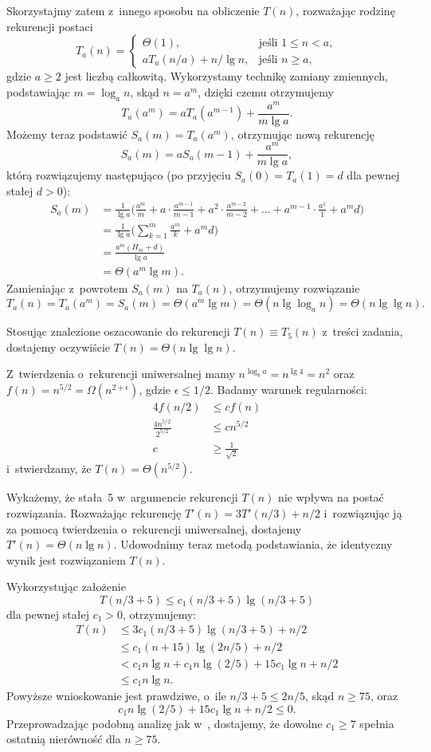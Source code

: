 Skorzystajmy zatem z~innego sposobu na obliczenie $T(n)$, rozważając rodzinę rekurencji postaci
\[
	T_a(n) = \begin{cases}
		\Theta(1), & \text{jeśli $1\le n<a$}, \\
		aT_a(n/a)+n/\!\lg n, & \text{jeśli $n\ge a$},
	\end{cases}
\]
gdzie $a\ge2$ jest liczbą całkowitą. Wykorzystamy technikę zamiany zmiennych, podstawiając $m=\log_an$, skąd $n=a^m$, dzięki czemu otrzymujemy
\[
	T_a(a^m) = aT_a(a^{m-1})+\frac{a^m}{m\lg a}.
\]
Możemy teraz podstawić $S_a(m)=T_a(a^m)$, otrzymując nową rekurencję
\[
	S_a(m) = aS_a(m-1)+\frac{a^m}{m\lg a},
\]
którą rozwiązujemy następująco (po przyjęciu $S_a(0)=T_a(1)=d$ dla pewnej stałej $d>0$):
\begin{align*}
	S_a(m) &= \frac{1}{\lg a}\biggl(\frac{a^m}{m}+a\cdot\frac{a^{m-1}}{m-1}+a^2\cdot\frac{a^{m-2}}{m-2}+\dots+a^{m-1}\cdot\frac{a^1}{1}+a^md\biggr) \\[1mm]
	&= \frac{1}{\lg a}\biggl(\sum_{k=1}^m\frac{a^m}{k}+a^md\biggr) \\[1mm]
	&= \frac{a^m(H_m+d)}{\lg a} \\[1mm]
	&= \Theta(a^m\lg m).
\end{align*}
Zamieniając z~powrotem $S_a(m)$ na $T_a(n)$, otrzymujemy rozwiązanie
\[
	T_a(n) = T_a(a^m) = S_a(m) = \Theta(a^m\lg m) = \Theta(n\lg\log_a n) = \Theta(n\lg\lg n).
\]

Stosując znalezione oszacowanie do rekurencji $T(n)\equiv T_5(n)$ z~treści zadania, dostajemy oczywiście $T(n)=\Theta(n\lg\lg n)$.

\subproblem %
Z~twierdzenia o~rekurencji uniwersalnej mamy $n^{\log_ba}=n^{\lg4}=n^2$ oraz $f(n)=n^{5/2}=\Omega(n^{2+\epsilon})$, gdzie $\epsilon\le1/2$. Badamy warunek regularności:
\begin{align*}
	4f(n/2) &\le cf(n) \\
	\frac{4n^{5/2}}{2^{5/2}} &\le cn^{5/2} \\
	c &\ge \frac{1}{\sqrt{2}}
\end{align*}
i~stwierdzamy, że $T(n)=\Theta(n^{5/2})$.

\subproblem %
Wykażemy, że stała~5 w~argumencie rekurencji $T(n)$ nie wpływa na postać rozwiązania. Rozważając rekurencję $T'(n)=3T'(n/3)+n/2$ i~rozwiązując ją za pomocą twierdzenia o~rekurencji uniwersalnej, dostajemy $T'(n)=\Theta(n\lg n)$. Udowodnimy teraz metodą podstawiania, że identyczny wynik jest rozwiązaniem $T(n)$.

Wykorzystując założenie
\[
	T(n/3+5) \le c_1(n/3+5)\lg(n/3+5)
\]
dla pewnej stałej $c_1>0$, otrzymujemy:
\begin{align*}
	T(n) &\le 3c_1(n/3+5)\lg(n/3+5)+n/2 \\
	&\le c_1(n+15)\lg(2n/5)+n/2 \\
	&< c_1n\lg n+c_1n\lg(2/5)+15c_1\!\lg n+n/2 \\
	&\le c_1n\lg n.
\end{align*}
Powyższe wnioskowanie jest prawdziwe, o~ile $n/3+5\le2n/5$, skąd $n\ge75$, oraz
\[
	c_1n\lg(2/5)+15c_1\!\lg n+n/2 \le 0.
\]
Przeprowadzając podobną analizę jak w~, dostajemy, że dowolne $c_1\ge7$ spełnia ostatnią nierówność dla $n\ge75$.

